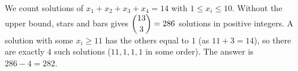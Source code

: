 We count solutions of $x_1+x_2+x_3+x_4=14$ with $1\le x_i\le10$. Without the upper bound, stars and bars gives $\dbinom{13}{3}=286$ solutions in positive integers. A solution with some $x_i\ge11$ has the others equal to $1$ (as $11+3=14$), so there are exactly $4$ such solutions ($11,1,1,1$ in some order). The answer is $286-4=\boxed{282}$.

